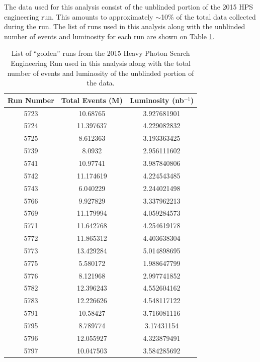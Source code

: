 The data used for this analysis consist of the unblinded portion of the 2015 
HPS engineering run.  This amounts to approximately $\sim$10\% of the total 
data collected during the run.  The list of runs used in this analysis along
with the unblinded number of events and luminosity for each run 
are shown on Table \ref{tab:data}.
\begin{table}[t]
    \begin{center}
        \begin{tabular}{ccc}
            \hline
            \textbf{Run Number} & \textbf{Total Events (M)} & \textbf{Luminosity (nb$^{-1}$)} \\
            \hline
            5723 & 10.68765  & 3.927681901  \\
            5724 & 11.397637 & 4.229082832    \\
            5725 & 8.612363  & 3.193363425   \\
            5739 & 8.0932    & 2.956111602   \\
            5741 & 10.97741  & 3.987840806   \\
            5742 & 11.174619 & 4.224543485   \\
            5743 & 6.040229  & 2.244021498 \\
            5766 & 9.927829  & 3.337962213 \\
            5769 & 11.179994 & 4.059284573 \\
            5771 & 11.642768 & 4.254619178 \\
            5772 & 11.865312 & 4.403638304 \\
            5773 & 13.429284 & 5.014898695 \\
            5775 & 5.580172  & 1.988647799 \\
            5776 & 8.121968  & 2.997741852 \\
            5782 & 12.396243 & 4.552604162 \\
            5783 & 12.226626 & 4.548117122 \\
            5791 & 10.58427  & 3.716081116 \\
            5795 & 8.789774  & 3.17431154 \\
            5796 & 12.055927 & 4.323879491 \\
            5797 & 10.047503 & 3.584285692  
        \end{tabular}
    \end{center}
    \caption{List of ``golden'' runs from the 2015 Heavy Photon Search Engineering Run used
             in this analysis along with the total number of events
             and luminosity of the unblinded portion of the data.}
    \label{tab:data}
\end{table}

